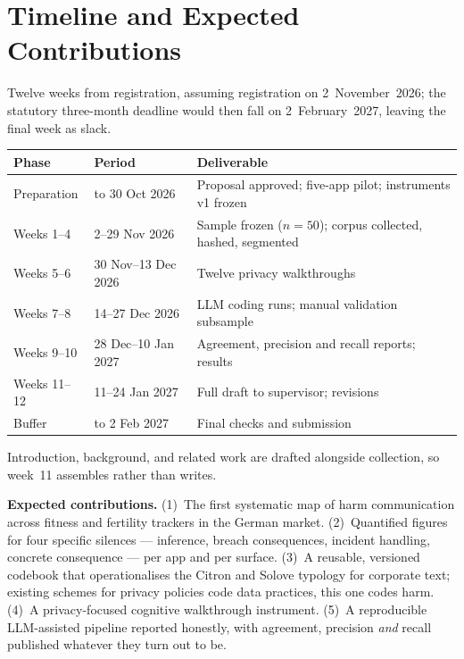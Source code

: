 \documentclass[10pt,a4paper]{article}
\begin{document}
\section{Timeline and Expected Contributions}

Twelve weeks from registration, assuming registration on 2~November~2026; the
statutory three-month deadline would then fall on 2~February~2027, leaving the
final week as slack.

\begin{table}[h]
\centering\footnotesize
\begin{tabularx}{\textwidth}{@{}llX@{}}
\toprule
\textbf{Phase} & \textbf{Period} & \textbf{Deliverable} \\
\midrule
Preparation  & to 30 Oct 2026      & Proposal approved; five-app pilot; instruments v1 frozen \\
Weeks 1--4   & 2--29 Nov 2026      & Sample frozen ($n = 50$); corpus collected, hashed, segmented \\
Weeks 5--6   & 30 Nov--13 Dec 2026 & Twelve privacy walkthroughs \\
Weeks 7--8   & 14--27 Dec 2026     & LLM coding runs; manual validation subsample \\
Weeks 9--10  & 28 Dec--10 Jan 2027 & Agreement, precision and recall reports; results \\
Weeks 11--12 & 11--24 Jan 2027     & Full draft to supervisor; revisions \\
Buffer       & to 2 Feb 2027       & Final checks and submission \\
\bottomrule
\end{tabularx}
\end{table}

\noindent Introduction, background, and related work are drafted alongside
collection, so week~11 assembles rather than writes.

\textbf{Expected contributions.} (1)~The first systematic map of harm
communication across fitness and fertility trackers in the German market.
(2)~Quantified figures for four specific silences --- inference, breach
consequences, incident handling, concrete consequence --- per app and per
surface. (3)~A reusable, versioned codebook that operationalises the Citron and
Solove typology for corporate text; existing schemes for privacy policies code
data practices, this one codes harm. (4)~A privacy-focused cognitive walkthrough
instrument. (5)~A reproducible LLM-assisted pipeline reported honestly, with
agreement, precision \emph{and} recall published whatever they turn out to be.
\end{document}
